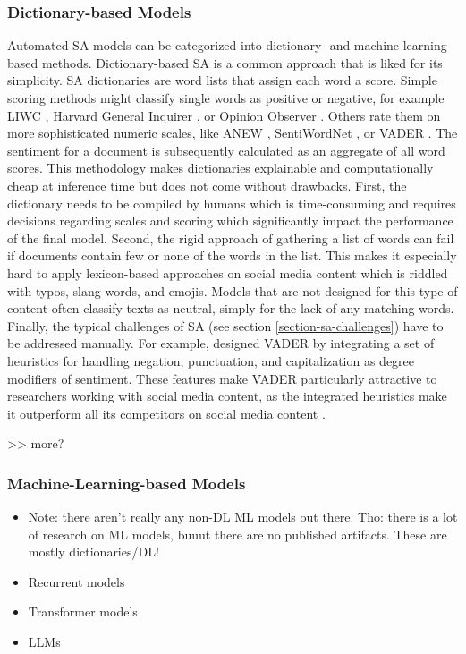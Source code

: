 \subsubsection{Dictionary-based Models}
Automated SA models can be categorized into dictionary- and machine-learning-based methods. Dictionary-based SA is a common approach that is liked for its simplicity. SA dictionaries are word lists that assign each word a score. Simple scoring methods might classify single words as positive or negative, for example LIWC , Harvard General Inquirer , or Opinion Observer . Others rate them on more sophisticated numeric scales, like ANEW , SentiWordNet , or VADER . The sentiment for a document is subsequently calculated as an aggregate of all word scores. This methodology makes dictionaries explainable and computationally cheap at inference time but does not come without drawbacks. First, the dictionary needs to be compiled by humans which is time-consuming and requires decisions regarding scales and scoring which significantly impact the performance of the final model. Second, the rigid approach of gathering a list of words can fail if documents contain few or none of the words in the list. This makes it especially hard to apply lexicon-based approaches on social media content which is riddled with typos, slang words, and emojis. Models that are not designed for this type of content often classify texts as neutral, simply for the lack of any matching words. Finally, the typical challenges of SA (see section \ref{section-sa-challenges}) have to be addressed manually. For example,  designed VADER by integrating a set of heuristics for handling negation, punctuation, and capitalization as degree modifiers of sentiment. These features make VADER particularly attractive to researchers working with social media content, as the integrated heuristics make it outperform all its competitors on social media content \cite{al2020evaluating}.

>> more?
\subsubsection{Machine-Learning-based Models}
\begin{itemize}[noitemsep]
	\item Note: there aren't really any non-DL ML models out there. Tho: there is a lot of research on ML models, buuut there are no published artifacts. These are mostly dictionaries/DL!
	\item Recurrent models
	\item Transformer models
	\item LLMs
\end{itemize}



